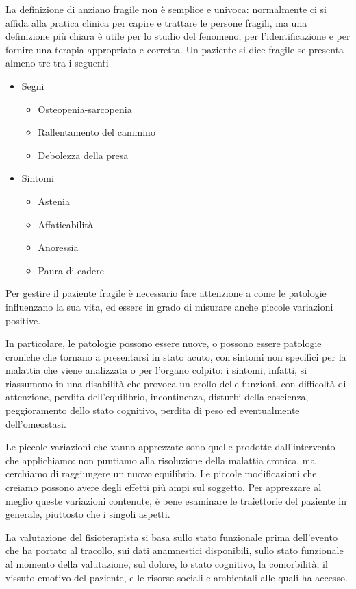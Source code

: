 La definizione di anziano fragile non è semplice e univoca: normalmente ci si
affida alla pratica clinica per capire e trattare le persone fragili, ma una
definizione più chiara è utile per lo studio del fenomeno, per l'identificazione
e per fornire una terapia appropriata e corretta.
Un paziente si dice fragile se presenta almeno tre tra i seguenti
\begin{itemize}
\item Segni
	\begin{itemize}
	\item Osteopenia-sarcopenia
	\item Rallentamento del cammino
	\item Debolezza della presa
	\end{itemize}
\item Sintomi
	\begin{itemize}
	\item Astenia
	\item Affaticabilità
	\item Anoressia
	\item Paura di cadere
	\end{itemize}
\end{itemize}

Per gestire il paziente fragile è necessario fare attenzione a come le patologie
influenzano la sua vita, ed essere in grado di misurare anche piccole variazioni
positive.

In particolare, le patologie possono essere nuove, o possono essere patologie
croniche che tornano a presentarsi in stato acuto, con sintomi non specifici per
la malattia che viene analizzata o per l'organo colpito: i sintomi, infatti,
si riassumono in una disabilità che provoca un crollo delle funzioni, con
difficoltà di attenzione, perdita dell'equilibrio, incontinenza, disturbi della
coscienza, peggioramento dello stato cognitivo, perdita di peso ed eventualmente
dell'omeostasi.

Le piccole variazioni che vanno apprezzate sono quelle prodotte dall'intervento
che applichiamo: non puntiamo alla risoluzione della malattia cronica, ma
cerchiamo di raggiungere un nuovo equilibrio. Le piccole modificazioni che
creiamo possono avere degli effetti più ampi sul soggetto. Per apprezzare al
meglio queste variazioni contenute, è bene esaminare le traiettorie del
paziente in generale, piuttosto che i singoli aspetti.

La valutazione del fisioterapista si basa sullo stato funzionale prima
dell'evento che ha portato al tracollo, sui dati anamnestici disponibili,
sullo stato funzionale al momento della valutazione, sul dolore, lo stato
cognitivo, la comorbilità, il vissuto emotivo del paziente, e le risorse sociali
e ambientali alle quali ha accesso. 

